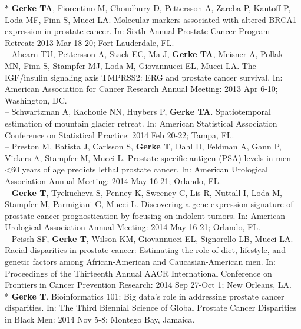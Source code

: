 \documentclass[11pt, a4paper]{article} %
\begin{document}
$*$ {\bf Gerke TA}, Fiorentino M, Choudhury D, Pettersson A, Zareba P, Kantoff P, Loda MF, Finn S, Mucci LA. Molecular markers associated with altered BRCA1 expression in prostate cancer. In: Sixth Annual Prostate Cancer Program Retreat: 2013 Mar 18-20; Fort Lauderdale, FL.\\

-- Ahearn TU, Pettersson A, Stack EC, Ma J, {\bf Gerke TA}, Meisner A, Pollak MN, Finn S, Stampfer MJ, Loda M, Giovannucci EL, Mucci LA.  The IGF/insulin signaling axis TMPRSS2: ERG and prostate cancer survival.  In: American Association for Cancer Research Annual Meeting: 2013 Apr 6-10; Washington, DC.\\

-- Schwartzman A, Kachouie NN, Huybers P, {\bf Gerke TA}. Spatiotemporal estimation of mountain glacier retreat. In: American Statistical Association Conference on Statistical Practice: 2014 Feb 20-22; Tampa, FL.\\

-- Preston M, Batista J, Carlsson S, {\bf Gerke T}, Dahl D, Feldman A, Gann P, Vickers A, Stampfer M, Mucci L. Prostate-specific antigen (PSA) levels in men <60 years of age predicts lethal prostate cancer. In: American Urological Association Annual Meeting: 2014 May 16-21; Orlando, FL.\\

-- {\bf Gerke T}, Tyekucheva S, Penney K, Sweeney C, Lis R, Nuttall I, Loda M, Stampfer M, Parmigiani G, Mucci L. Discovering a gene expression signature of prostate cancer prognostication by focusing on indolent tumors. In: American Urological Association Annual Meeting: 2014 May 16-21; Orlando, FL.\\

-- Peisch SF, {\bf Gerke T}, Wilson KM, Giovannucci EL, Signorello LB, Mucci LA. Racial disparities in prostate cancer: Estimating the role of diet, lifestyle, and genetic factors among African-American and Caucasian-American men. In: Proceedings of the Thirteenth Annual AACR International Conference on Frontiers in Cancer Prevention Research: 2014 Sep 27-Oct 1; New Orleans, LA.\\

* {\bf Gerke T}. Bioinformatics 101: Big data's role in addressing prostate cancer disparities. In: The Third Biennial Science of Global Prostate Cancer Disparities in Black Men: 2014 Nov 5-8; Montego Bay, Jamaica.\\
\end{document}
